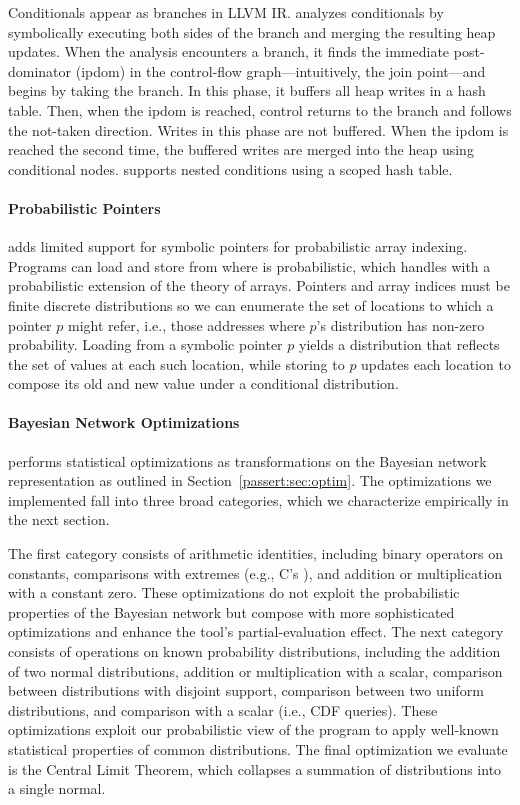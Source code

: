 Conditionals appear as branches in LLVM IR.
\tool analyzes conditionals by
symbolically executing both sides of the branch and merging the resulting heap
updates. When the analysis encounters a branch, it finds the immediate post-dominator
(ipdom) in the control-flow graph---intuitively, the join point---and begins by taking
the branch. In this phase, it buffers all heap writes in a hash table.
Then, when the ipdom is reached, control returns to the
branch and follows the not-taken direction. Writes in this phase are not
buffered. When the ipdom is reached the second time, the buffered writes are
merged into the heap using conditional nodes.
\tool supports nested conditions using a scoped hash table.

\paragraph{Probabilistic Pointers}

\tool adds limited support for symbolic pointers for probabilistic array
indexing. Programs can load and store from  where  is
probabilistic, which \tool handles with a probabilistic extension of the
theory of
arrays. Pointers and array indices must be finite discrete
distributions so we can enumerate the set of locations to which a pointer $p$
might refer, i.e., those addresses where $p$'s distribution has non-zero
probability.
Loading from a symbolic pointer $p$ yields a distribution that
reflects the set of values at each such location, while storing to
$p$ updates each location to compose its old and new value
under a conditional distribution.

\paragraph{Bayesian Network Optimizations}

\tool performs statistical optimizations as transformations on the Bayesian
network representation as outlined in Section~\ref{passert:sec:optim}. The
optimizations we implemented fall into three broad categories,
which we characterize empirically in the next section.

The first category consists of arithmetic identities, including
binary operators on constants, comparisons with extremes (e.g.,
C's ), and addition or multiplication with a constant zero.
These optimizations do not exploit the probabilistic properties of the
Bayesian network but compose with more sophisticated optimizations and enhance
the tool's partial-evaluation effect.
The next category consists of operations on known probability distributions,
including the addition of two normal distributions, addition or
multiplication with a scalar, comparison between distributions with disjoint
support, comparison between two uniform distributions, and comparison with a
scalar (i.e., CDF queries).
These optimizations exploit our probabilistic view of the program to apply
well-known statistical properties of common distributions.
The final optimization we evaluate is the Central Limit Theorem, which
collapses a summation of distributions into a single normal.

